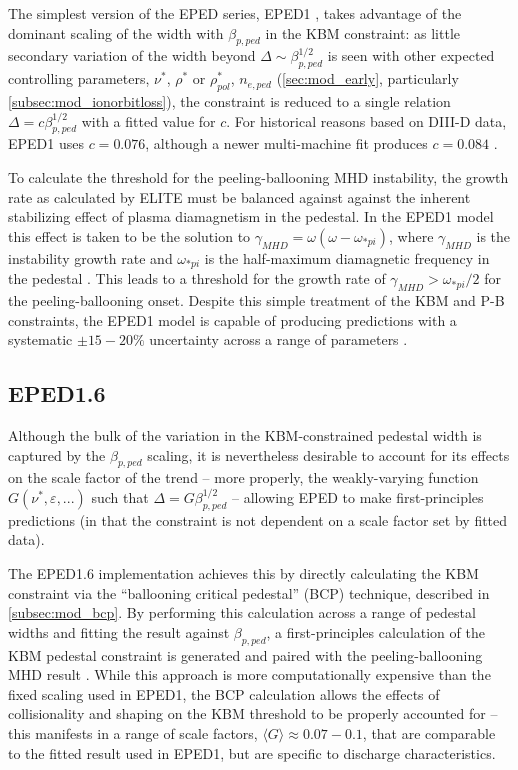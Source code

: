 The simplest version of the EPED series, EPED1 \cite{Snyder2009}, takes advantage of the dominant scaling of the width with $\beta_{p,ped}$ in the KBM constraint: as little secondary variation of the width beyond $\Delta \sim \beta_{p,ped}^{1/2}$ is seen with other expected controlling parameters, \eg $\nu^*$, $\rho^*$ or $\rho^*_{pol}$, $n_{e,ped}$ \cite{Snyder2009} (\cf \cref{sec:mod_early}, particularly \cref{subsec:mod_ionorbitloss}), the constraint is reduced to a single relation $\Delta = c \beta_{p,ped}^{1/2}$ with a fitted value for $c$.  For historical reasons based on DIII-D data, EPED1 uses $c = 0.076$, although a newer multi-machine fit produces $c = 0.084$ \cite{Snyder2011}. 

To calculate the threshold for the peeling-ballooning MHD instability, the growth rate as calculated by ELITE must be balanced against against the inherent stabilizing effect of plasma diamagnetism in the pedestal.  In the EPED1 model this effect is taken to be the solution to $\gamma_{MHD} = \omega (\omega - \omega_{*pi})$, where $\gamma_{MHD}$ is the instability growth rate and $\omega_{*pi}$ is the half-maximum diamagnetic frequency in the pedestal \cite{Snyder2009}.  This leads to a threshold for the growth rate of $\gamma_{MHD} > \omega_{*pi}/2$ for the peeling-ballooning onset.  Despite this simple treatment of the KBM and P-B constraints, the EPED1 model is capable of producing predictions with a systematic $\pm 15-20\%$ uncertainty across a range of parameters \cite{Snyder2009,Snyder2010}.

\subsection{EPED1.6}\label{subsec:mod_eped16}

Although the bulk of the variation in the KBM-constrained pedestal width is captured by the $\beta_{p,ped}$ scaling, it is nevertheless desirable to account for its effects on the scale factor of the trend -- more properly, the weakly-varying function $G(\nu^*,\varepsilon,...)$ such that $\Delta = G \beta_{p,ped}^{1/2}$ -- allowing EPED to make first-principles predictions (in that the constraint is not dependent on a scale factor set by fitted data).  

The EPED1.6 implementation \cite{Snyder2010,Snyder2011} achieves this by directly calculating the KBM constraint via the ``ballooning critical pedestal'' (BCP) technique, described in \cref{subsec:mod_bcp}.    By performing this calculation across a range of pedestal widths and fitting the result against $\beta_{p,ped}$, a first-principles calculation of the KBM pedestal constraint is generated and paired with the peeling-ballooning MHD result \cite{Snyder2011}.  While this approach is more computationally expensive than the fixed scaling used in EPED1, the BCP calculation allows the effects of collisionality and shaping on the KBM threshold to be properly accounted for -- this manifests in a range of scale factors, $\langle G \rangle \approx 0.07-0.1$, that are comparable to the fitted result used in EPED1, but are specific to discharge characteristics.

